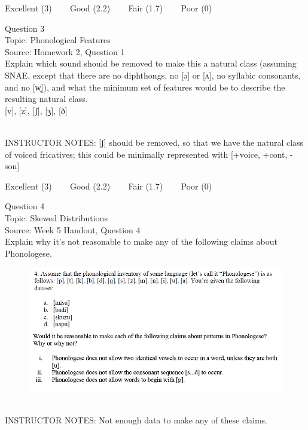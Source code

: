 \documentclass[12pt]{article}
\begin{document}
\vfill
Excellent (3) ~~~ Good (2.2) ~~~ Fair (1.7) ~~~ Poor (0)
\newpage

{\large Question 3}\\

Topic: Phonological Features\\
Source: Homework 2, Question 1\\

Explain which sound should be removed to make this a natural class (assuming SNAE, except that there are no diphthongs, no [ə] or [ʌ], no syllabic consonants, and no [w̥]), and what the minimum set of features would be to describe the resulting natural class.\\

{[v]}, {[z]}, {[ʃ]}, {[ʒ]}, {[ð]}


~\\
INSTRUCTOR NOTES: [ʃ] should be removed, so that we have the natural class of voiced fricatives; this could be minimally represented with [+voice, +cont, -son]


\vfill
Excellent (3) ~~~ Good (2.2) ~~~ Fair (1.7) ~~~ Poor (0)
\newpage

{\large Question 4}\\

Topic: Skewed Distributions\\
Source: Week 5 Handout, Question 4\\

Explain why it's not reasonable to make any of the following claims about Phonologese.\\

\begin{figure}[H]
\includegraphics{../images/Phonologese.png}
\end{figure}

~\\
INSTRUCTOR NOTES: Not enough data to make any of these claims.
\end{document}
